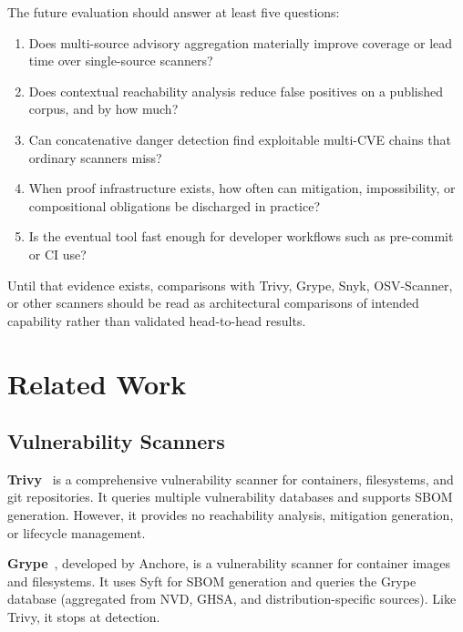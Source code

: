 \documentclass[11pt,twocolumn]{article}
\begin{document}
The future evaluation should answer at least five questions:

\begin{enumerate}[nosep]
  \item Does multi-source advisory aggregation materially improve
    coverage or lead time over single-source scanners?
  \item Does contextual reachability analysis reduce false positives on
    a published corpus, and by how much?
  \item Can concatenative danger detection find exploitable multi-CVE
    chains that ordinary scanners miss?
  \item When proof infrastructure exists, how often can mitigation,
    impossibility, or compositional obligations be discharged in
    practice?
  \item Is the eventual tool fast enough for developer workflows such as
    pre-commit or CI use?
\end{enumerate}

Until that evidence exists, comparisons with Trivy, Grype, Snyk,
OSV-Scanner, or other scanners should be read as architectural
comparisons of intended capability rather than validated head-to-head
results.

\section{Related Work}
\label{sec:related}

\subsection{Vulnerability Scanners}

\textbf{Trivy}~\cite{trivy} is a comprehensive vulnerability scanner
for containers, filesystems, and git repositories. It queries multiple
vulnerability databases and supports SBOM generation. However, it
provides no reachability analysis, mitigation generation, or lifecycle
management.

\textbf{Grype}~\cite{grype}, developed by Anchore, is a vulnerability
scanner for container images and filesystems. It uses Syft for SBOM
generation and queries the Grype database (aggregated from NVD, GHSA,
and distribution-specific sources). Like Trivy, it stops at detection.
\end{document}
